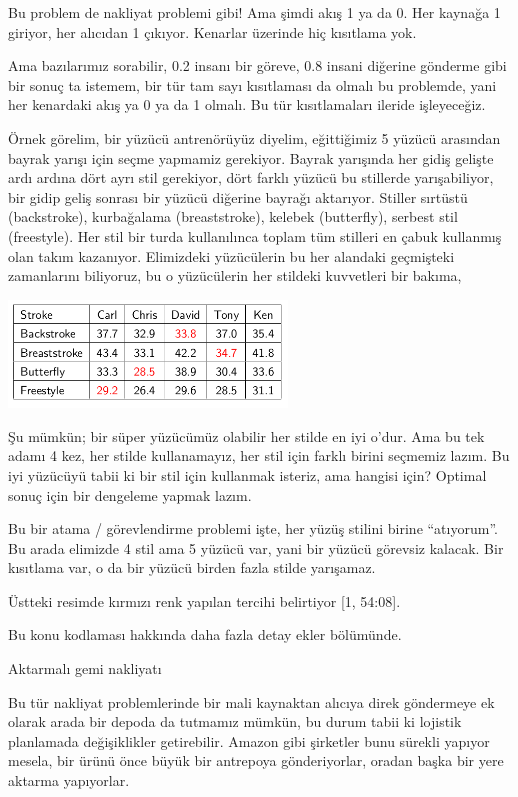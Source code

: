 \documentclass[12pt,fleqn]{article}\usepackage{../../common}
\begin{document}
Bu problem de nakliyat problemi gibi! Ama şimdi akış 1 ya da 0. Her kaynağa
1 giriyor, her alıcıdan 1 çıkıyor. Kenarlar üzerinde hiç kısıtlama yok. 

Ama bazılarımız sorabilir, 0.2 insanı bir göreve, 0.8 insani diğerine
gönderme gibi bir sonuç ta istemem, bir tür tam sayı kısıtlaması da olmalı
bu problemde, yani her kenardaki akış ya 0 ya da 1 olmalı. Bu tür
kısıtlamaları ileride işleyeceğiz. 

Örnek görelim, bir yüzücü antrenörüyüz diyelim, eğittiğimiz 5 yüzücü
arasından bayrak yarışı için seçme yapmamiz gerekiyor. Bayrak yarışında her
gidiş gelişte ardı ardına dört ayrı stil gerekiyor, dört farklı yüzücü bu
stillerde yarışabiliyor, bir gidip geliş sonrası bir yüzücü diğerine
bayrağı aktarıyor. Stiller sırtüstü (backstroke), kurbağalama
(breaststroke), kelebek (butterfly), serbest stil (freestyle). Her stil bir
turda kullanılınca toplam tüm stilleri en çabuk kullanmış olan takım
kazanıyor. Elimizdeki yüzücülerin bu her alandaki geçmişteki zamanlarını
biliyoruz, bu o yüzücülerin her stildeki kuvvetleri bir bakıma,

\includegraphics[width=20em]{func_90_nflow_07.png}

Şu mümkün; bir süper yüzücümüz olabilir her stilde en iyi o'dur. Ama bu tek
adamı 4 kez, her stilde kullanamayız, her stil için farklı birini seçmemiz
lazım. Bu iyi yüzücüyü tabii ki bir stil için kullanmak isteriz, ama
hangisi için?  Optimal sonuç için bir dengeleme yapmak lazım.

Bu bir atama / görevlendirme problemi işte, her yüzüş stilini birine
``atıyorum''. Bu arada elimizde 4 stil ama 5 yüzücü var, yani bir yüzücü
görevsiz kalacak. Bir kısıtlama var, o da bir yüzücü birden fazla stilde
yarışamaz.

Üstteki resimde kırmızı renk yapılan tercihi belirtiyor [1, 54:08]. 

Bu konu kodlaması hakkında daha fazla detay ekler bölümünde. 

Aktarmalı gemi nakliyatı

Bu tür nakliyat problemlerinde bir mali kaynaktan alıcıya direk göndermeye
ek olarak arada bir depoda da tutmamız mümkün, bu durum tabii ki lojistik
planlamada değişiklikler getirebilir. Amazon gibi şirketler bunu sürekli
yapıyor mesela, bir ürünü önce büyük bir antrepoya gönderiyorlar, oradan
başka bir yere aktarma yapıyorlar. 
\end{document}

